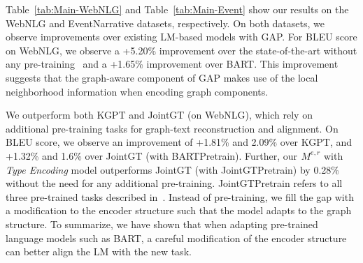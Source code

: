 \documentclass[11pt]{article}
\begin{document}
\begin{table}[]
\caption{\label{tab:Main-Event} Performance comparison on EventNarrative. We compare to the pretrained baselines, T5 and BART, reprinted from~\cite{colas2021eventnarrative}, and adapt JointGT~\cite{ke-etal-2021-jointgt} to the dataset.}
\end{table}

Table~\ref{tab:Main-WebNLG} and Table~\ref{tab:Main-Event} show our results on the WebNLG and EventNarrative datasets, respectively. On both datasets, we observe improvements over existing LM-based models with GAP. For BLEU score on WebNLG, we observe a +5.20\% improvement over the state-of-the-art without any pre-training~\cite{shimorina2018handling} and a +1.65\% improvement over BART. This improvement suggests that the graph-aware component of GAP makes use of the local neighborhood information when encoding graph components. 

We outperform both KGPT and JointGT (on WebNLG), which rely on additional pre-training tasks for graph-text reconstruction and alignment. On BLEU score, we observe an improvement of +1.81\% and 2.09\% over KGPT, and +1.32\% and 1.6\% over JointGT (with BARTPretrain). Further, our $ {}^{}_{}M^{e,r}_{}$ with \textit{Type Encoding} model outperforms JointGT (with JointGTPretrain) by 0.28\% without the need for any additional pre-training. JointGTPretrain refers to all three pre-trained tasks described in~\citet{ke-etal-2021-jointgt}. Instead of pre-training, we fill the gap with a modification to the encoder structure such that the model adapts to the graph structure. To summarize, we have shown that when adapting pre-trained language models such as BART, a careful modification of the encoder structure can better align the LM with the new task.
\end{document}
